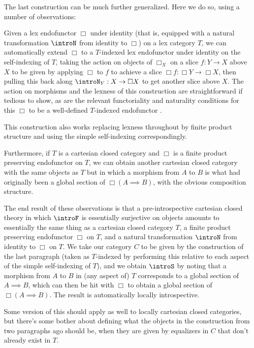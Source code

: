 \begin{observation}\label{CartesianClosedLocallyIntrosp}
The last construction can be much further generalized. Here we do so, using a number of observations:

Given a lex endofunctor $\Box$ under identity (that is, equipped with a natural transformation $\introN$ from identity to $\Box$) on a lex category $T$, we can automatically extend $\Box$ to a $T$-indexed lex endofunctor under identity on the self-indexing of $T$, taking the action on objects of $\Box_X$ on a slice $f : Y \to X$ above $X$ to be given by applying $\Box$ to $f$ to achieve a slice $\Box f : \Box Y \to \Box X$, then pulling this back along $\introN_Y : X \to \Box X$ to get another slice above $X$. The action on morphisms and the lexness of this construction are straightforward if tedious to show, as are the relevant functoriality and naturality conditions for this $\Box$ to be a well-defined $T$-indexed endofunctor \TODO.

This construction also works replacing lexness throughout by finite product structure and using the simple self-indexing correspondingly.

Furthermore, if $T$ is a cartesian closed category and $\Box$ is a finite product preserving endofunctor on $T$, we can obtain another cartesian closed category with the same objects as $T$ but in which a morphism from $A$ to $B$ is what had originally been a global section of $\Box (A \implies B)$, with the obvious composition structure.

The end result of these observations is that a pre-introspective cartesian closed theory in which $\introF$ is essentially surjective on objects amounts to essentially the same thing as a cartesian closed category $T$, a finite product preserving endofunctor $\Box$ on $T$, and a natural transformation $\introN$ from identity to $\Box$ on $T$. We take our category $C$ to be given by the construction of the last paragraph (taken as $T$-indexed by performing this relative to each aspect of the simple self-indexing of $T$), and we obtain $\introS$ by noting that a morphism from $A$ to $B$ in (any aspect of) $T$ corresponds to a global section of $A \implies B$, which can then be hit with $\Box$ to obtain a global section of $\Box (A \implies B)$. The result is automatically locally introspective.

Some version of this should apply as well to locally cartesian closed categories, but there's some bother about defining what the objects in the construction from two paragraphs ago should be, when they are given by equalizers in $C$ that don't already exist in $T$.


\end{observation}
